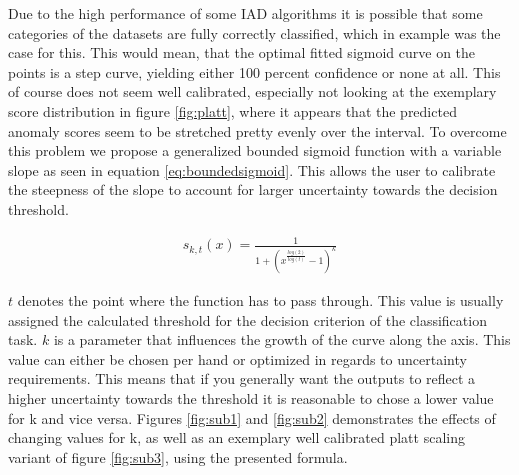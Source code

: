 Due to the high performance of some IAD algorithms it is possible that some categories 
of the datasets are fully correctly classified, which in example was the case for this. This would mean, that the optimal fitted sigmoid curve on the points 
is a step curve, yielding either 100 percent confidence or none at all. This of course does not seem well calibrated, especially not looking at the exemplary score distribution in figure \ref{fig:platt}, where it 
appears that the predicted anomaly scores seem to be stretched pretty evenly over the interval. To overcome this problem 
we propose a generalized bounded sigmoid function with a variable slope \cite{bounded_sigmoid} as seen in equation \ref{eq:boundedsigmoid}. This allows the user to calibrate the steepness of the slope to account for larger uncertainty 
towards the decision threshold.

\begin{equation}
    \label{eq:boundedsigmoid}
    \begin{split}
        s_{k, t}(x) = \frac{1}{1 + (x^{\frac{log(2)}{log(t)}} - 1)^{k}}
    \end{split}
\end{equation}

$t$ denotes the point where the function has to pass through. This value is usually assigned the calculated threshold for the decision criterion of the classification task. $k$ is a parameter 
that influences the growth of the curve along the axis. This value can either be chosen per hand or optimized in regards to uncertainty requirements. This means that if you generally want the 
outputs to reflect a higher uncertainty towards the threshold it is reasonable to chose a lower value for k and vice versa. Figures \ref{fig:sub1} and \ref{fig:sub2} demonstrates the effects of changing values for k, as well 
as an exemplary well calibrated platt scaling variant of figure \ref{fig:sub3}, using the presented formula.

